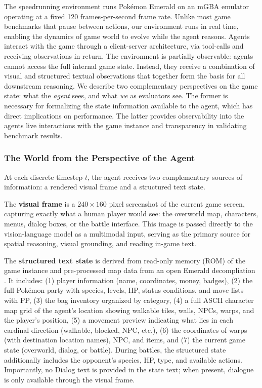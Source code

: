 The speedrunning environment runs Pok\'{e}mon Emerald on an mGBA emulator operating at a fixed 120 frames-per-second frame rate. Unlike most game benchmarks  that pause between actions, our environment runs in real time, enabling the dynamics of game world to evolve while the agent reasons. Agents interact with the game through a client-server architecture, via tool-calls and receiving observations in return. The environment is partially observable: agents cannot access the full internal game state. Instead, they receive a combination of visual and structured textual observations that together form the basis for all downstream reasoning. We describe two complementary perspectives on the game state: what the \emph{agent} sees, and what \emph{we} as evaluators see. The former is necessary for formalizing the state information available to the agent, which has direct implications on performance. The latter provides observability into the agents live interactions with the game instance and transparency in validating benchmark results.

\subsubsection{The World from the Perspective of the Agent}\label{sec:agent_perspective}

At each discrete timestep $t$, the agent receives two complementary sources of information: a rendered visual frame and a structured text state.

The \textbf{visual frame} is a $240 \times 160$ pixel screenshot of the current game screen, capturing exactly what a human player would see: the overworld map, characters, menus, dialog boxes, or the battle interface. This image is passed directly to the vision-language model as a multimodal input, serving as the primary source for spatial reasoning, visual grounding, and reading in-game text.

The \textbf{structured text state} is derived from read-only memory (ROM) of the game instance and pre-processed map data from an open \pokemon{} Emerald decompliation \citep{huderlem2025porymap}. It includes: (1) player information (name, coordinates, money, badges), (2) the full Pok\'{e}mon party with species, levels, HP, status conditions, and move lists with PP, (3) the bag inventory organized by category, (4) a full ASCII character map grid of the agent's location showing walkable tiles, walls, NPCs, warps, and the player's position, (5) a movement preview indicating what lies in each cardinal direction (walkable, blocked, NPC, etc.), (6) the coordinates of warps (with destination location names), NPC, and items, and (7) the current game state (overworld, dialog, or battle). During battles, the structured state additionally includes the opponent's species, HP, type, and available actions. Importantly, no Dialog text is provided in the state text; when present, dialogue is only available through the visual frame.


